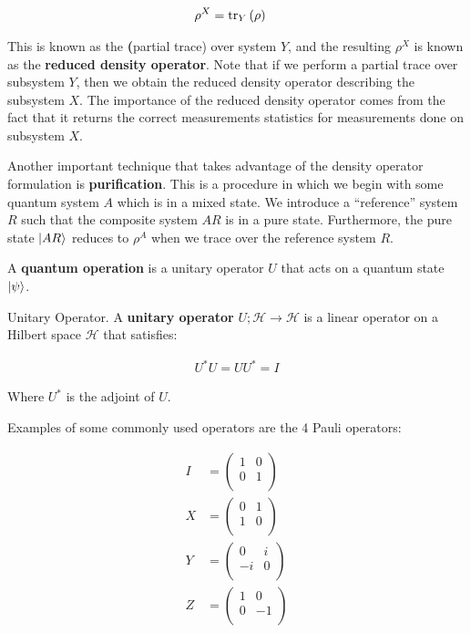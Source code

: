 \begin{align}
    \rho^X &= \trace[Y]{\rho}
\end{align}

This is known as the \textbf(partial trace) over system $Y$, and the resulting $\rho^X$ is known as the \textbf{reduced density operator}. Note that if we perform a partial trace over subsystem $Y$, then we obtain the reduced density operator describing the subsystem $X$. The importance of the reduced density operator comes from the fact that it returns the correct measurements statistics for measurements done on subsystem $X$.

Another important technique that takes advantage of the density operator formulation is \textbf{purification}. This is a procedure in which we begin with some quantum system $A$ which is in a mixed state. We introduce a ``reference'' system $R$ such that the composite system $AR$ is in a pure state. Furthermore, the pure state $\ket{AR}$ reduces to $\rho^A$ when we trace over the reference system $R$.

A \textbf{quantum operation} is a unitary operator $U$ that acts on a quantum state $\ket{\psi}$.

\begin{definition}{Unitary Operator.}
    A \textbf{unitary operator} $U;\mathcal{H} \to \mathcal{H}$ is a linear operator on a Hilbert space $\mathcal{H}$ that satisfies:
    
    \begin{align}
        U^*U = UU^* = I
    \end{align}
    
    Where $U^*$ is the adjoint of $U$.
\end{definition}

Examples of some commonly used operators are the 4 Pauli operators:

\begin{align}
    I &= \begin{pmatrix}
        1 & 0 \\ 
        0 & 1 \\ 
    \end{pmatrix} \\ 
    X &= \begin{pmatrix}
        0 & 1 \\ 
        1 & 0 \\ 
    \end{pmatrix} \\ 
    Y &= \begin{pmatrix}
        0 & i \\ 
        -i & 0 \\ 
    \end{pmatrix} \\ 
    Z &= \begin{pmatrix}
        1 & 0 \\ 
        0 & -1 \\ 
    \end{pmatrix}
\end{align}

